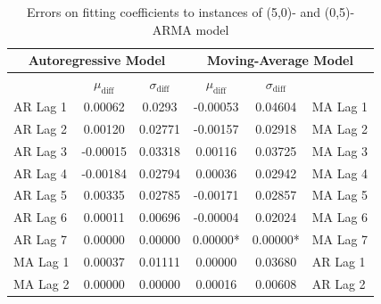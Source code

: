 \documentclass[oneside,12pt,openany]{book}
\begin{document}
    \begin{table}[hbt!]
        \centering
        \begin{tabular}{|l|c|c|c|c|l|}
            \hline
            \multicolumn{3}{|c|}{Autoregressive Model} & \multicolumn{3}{c|}{Moving-Average Model} \\ \hline
            \cellcolor{black} & $\mu_{\text{diff}}$ & $\sigma_{\text{diff}}$ & $\mu_{\text{diff}}$ & $\sigma_{\text{diff}}$ &  \cellcolor{black} \\ \hline
            AR Lag 1 & 0.00062 & 0.0293 & -0.00053 & 0.04604 & MA Lag 1 \\ \hline
            AR Lag 2 & 0.00120 & 0.02771 & -0.00157 & 0.02918 & MA Lag 2 \\ \hline
            AR Lag 3 & -0.00015 & 0.03318 & 0.00116 & 0.03725 & MA Lag 3 \\ \hline
            AR Lag 4 & -0.00184 & 0.02794 & 0.00036 & 0.02942 & MA Lag 4 \\ \hline
            AR Lag 5 & 0.00335 & 0.02785 & -0.00171 & 0.02857 & MA Lag 5 \\ \hline
            AR Lag 6 & 0.00011 & 0.00696 & -0.00004 & 0.02024 & MA Lag 6 \\ \hline
            AR Lag 7 & 0.00000 & 0.00000 & 0.00000* & 0.00000* & MA Lag 7 \\ \hline
            MA Lag 1 & 0.00037 & 0.01111 & 0.00000 & 0.03680 & AR Lag 1 \\ \hline
            MA Lag 2 & 0.00000 & 0.00000 & 0.00016 & 0.00608 & AR Lag 2 \\ \hline
        \end{tabular}
        \caption{Errors on fitting coefficients to instances of (5,0)- and (0,5)-ARMA model}
        \label{tab:errortsfitting5}
    \end{table}
    
\end{document}
